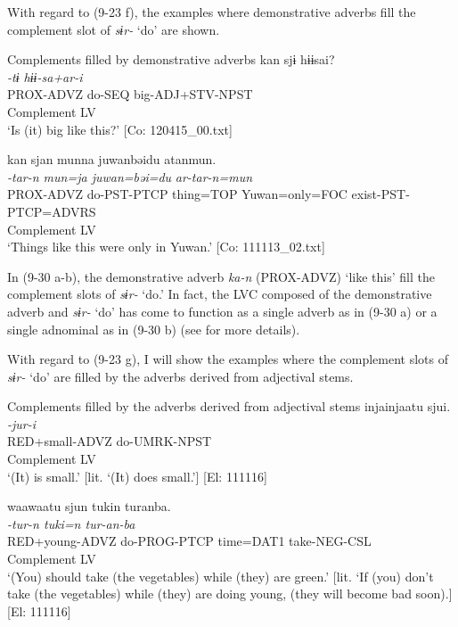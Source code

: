 With regard to (9-23 f), the examples where demonstrative adverbs fill the complement slot of \textit{sɨr-} ‘do’ are shown.

\ea   Complements filled by demonstrative adverbs \label{ex:9.30}
\ea %
 \gllll  kan  sjɨ  hɨɨsai?\\
      \textit{}  \textit{-tɨ  hɨɨ-sa+ar-i}\\
      PROX-ADVZ  do-SEQ  big-ADJ+STV-NPST\\
      Complement  LV  \\
    \glt       ‘Is (it) big like this?’ [Co: 120415\_00.txt]

  \ex %
  \glll kan  sjan  munna  juwanbəidu   atanmun.\\
      \textit{}  \textit{-tar-n  mun=ja  juwan=bəi=du} \textit{ar-tar-n=mun}\\
      PROX-ADVZ  do-PST-PTCP  thing=TOP  Yuwan=only=FOC exist-PST-PTCP=ADVRS\\
      Complement  LV\\      
      \glt ‘Things like this were only in Yuwan.’   [Co: 111113\_02.txt]
    \z
\z

In (9-30 a-b), the demonstrative adverb \textit{ka-n} (PROX-ADVZ) ‘like this’ fill the complement slots of \textit{sɨr-} ‘do.’ In fact, the LVC composed of the demonstrative adverb and \textit{sɨr-} ‘do’ has come to function as a single adverb as in (9-30 a) or a single adnominal as in (9-30 b) (see  for more details).

With regard to (9-23 g), I will show the examples where the complement slots of \textit{sɨr-} ‘do’ are filled by the adverbs derived from adjectival stems.

\ea   Complements filled by the adverbs derived from adjectival stems \label{ex:9.31}
\ea %
 \gllll  injainjaatu  sjui.\\
      \textit{}  \textit{-jur-i}\\
      RED+small-ADVZ  do-UMRK-NPST\\
      Complement  LV\\
      \glt       ‘(It) is small.’ [lit. ‘(It) does small.’] [El: 111116]

\ex \label{ex:9.31b} %
    \gllll  waawaatu  sjun  tukin  turanba.\\
      \textit{}  \textit{-tur-n  tuki=n  tur-an-ba}\\
      RED+young-ADVZ  do-PROG-PTCP  time=DAT1  take-NEG-CSL\\
      Complement  LV    \\
      \glt  ‘(You) should take (the vegetables) while (they) are green.’ [lit. ‘If (you) don’t take (the vegetables) while (they) are doing young, (they will become bad soon).] [El: 111116]
    \z
\z

